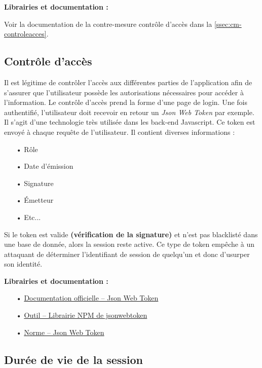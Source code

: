 \documentclass[12pt]{article}
\begin{document}
\medskip
\textbf{Librairies et documentation :}

Voir la documentation de la contre-mesure contrôle d'accès dans la \autoref{ssec:cm-controleacces}.

\subsection{Contrôle d'accès}
\label{ssec:cm-controleacces}

Il est légitime de contrôler l'accès aux différentes parties de l'application afin de s'assurer que l'utilisateur possède les autorisations nécessaires pour accéder à l'information. Le contrôle d'accès prend la forme d'une page de login. Une fois authentifié, l'utilisateur doit recevoir en retour un \emph{Json Web Token} par exemple. Il s'agit d'une technologie très utilisée dans les back-end Javascript. Ce token est envoyé à chaque requête de l'utilisateur. Il contient diverses informations :
\begin{itemize}
\item[•] Rôle
\item[•] Date d'émission
\item[•] Signature
\item[•] Émetteur
\item[•] Etc...
\end{itemize}
\medskip

Si le token est valide \textbf{(vérification de la signature)} et n'est pas blacklisté dans une base de donnée, alors la session reste active. Ce type de token empêche à un attaquant de déterminer l'identifiant de session de quelqu'un et donc d'usurper son identité.

\medskip
\textbf{Librairies et documentation :}

\begin{itemize}
\item[•] \href{https://jwt.io/}{Documentation officielle -- Json Web Token}
\item[•] \href{https://www.npmjs.com/package/jsonwebtoken}{Outil -- Librairie NPM de jsonwebtoken}
\item[•] \href{https://tools.ietf.org/html/rfc7519}{Norme -- Json Web Token}
\end{itemize}

\subsection{Durée de vie de la session}
\label{ssec:cm-dureeviesession}
\end{document}
